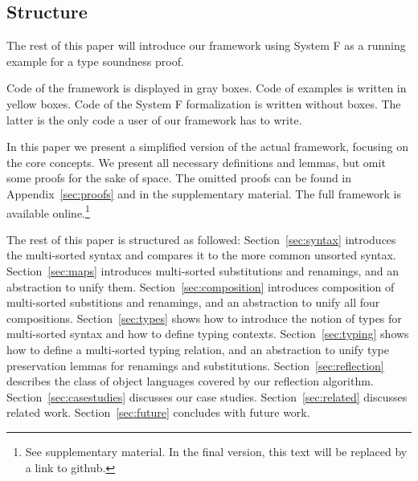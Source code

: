 \documentclass[a4paper, UKenglish, cleveref, autoref, thm-restate]{lipics-v2021}
\begin{document}
  \subsection{Structure}
  \label{sec:introduction:structure}

  The rest of this paper will introduce our framework using System F
  as a running example for a type soundness proof.

  Code of the framework is displayed in gray boxes.
  Code of examples is written in yellow boxes.
  Code of the System F formalization is written without boxes. The
  latter is the only code a user of our framework has to write.

  In this paper we present a simplified version of the actual
  framework, focusing on the core concepts. We present all necessary
  definitions and lemmas, but omit some proofs for the sake of
  space. The omitted proofs can be found in Appendix~\ref{sec:proofs}
  and in the supplementary material.
  The full framework is available online.\footnote{See supplementary material. In the final version, this text will be replaced by a link to github.}

  The rest of this paper is structured as followed:
  Section~\ref{sec:syntax} introduces the multi-sorted syntax and compares it to the
  more common unsorted syntax.
  Section~\ref{sec:maps} introduces multi-sorted substitutions and renamings, and
  an abstraction to unify them.
  Section~\ref{sec:composition} introduces composition of multi-sorted
  substitions and renamings, and an abstraction to unify all four
  compositions.
  Section~\ref{sec:types} shows how to introduce the notion of types
  for multi-sorted syntax and how to define typing contexts.
  Section~\ref{sec:typing} shows how to define a multi-sorted typing relation,
  and an abstraction to unify type preservation lemmas for renamings and substitutions.
  Section~\ref{sec:reflection} describes the class of object languages covered by
  our reflection algorithm.
  Section~\ref{sec:casestudies} discusses our case studies.
  Section~\ref{sec:related} discusses related work.
  Section~\ref{sec:future} concludes with future work.
\end{document}
